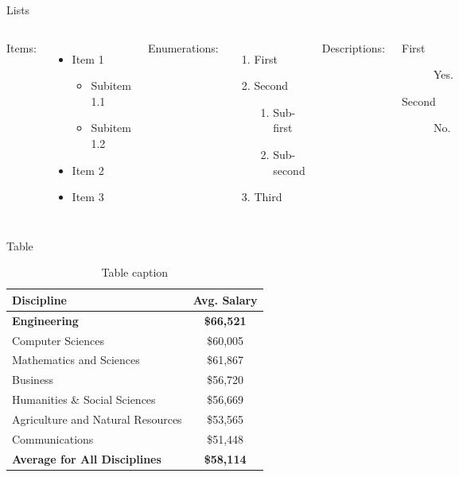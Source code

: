 \documentclass[aspectratio=169]{beamer}
\begin{document}
\begin{frame}{Lists}
	\begin{columns}[T, onlytextwidth] %
			Items:
			\begin{itemize}
				\item Item 1
				\begin{itemize}
					\item Subitem 1.1
					\item Subitem 1.2
				\end{itemize}
				\item Item 2
				\item Item 3
			\end{itemize}
		
			Enumerations:
			\begin{enumerate}
				\item First
				\item Second
				\begin{enumerate}
					\item Sub-first
					\item Sub-second
				\end{enumerate}
				\item Third
			\end{enumerate}
		
			Descriptions:
			\begin{description}
				\item[First] Yes.
				\item[Second] No.
			\end{description}
	\end{columns}
\end{frame}


\begin{frame}{Table}
	\begin{table}
		\centering %
		\begin{tabular}{l c}
			\toprule
			Discipline & Avg. Salary \\
			\toprule
			\textbf{Engineering} & \textbf{\$66,521} \\
			Computer Sciences & \$60,005\\
			Mathematics and Sciences & \$61,867\\
			Business & \$56,720\\
			Humanities \& Social Sciences & \$56,669\\
			Agriculture and Natural Resources & \$53,565\\
			Communications & \$51,448\\
			\midrule
			\textbf{Average for All Disciplines} & \textbf{\$58,114}\\
			\bottomrule
		\end{tabular}
	\caption{Table caption}
	\end{table}
\end{frame}
\end{document}
